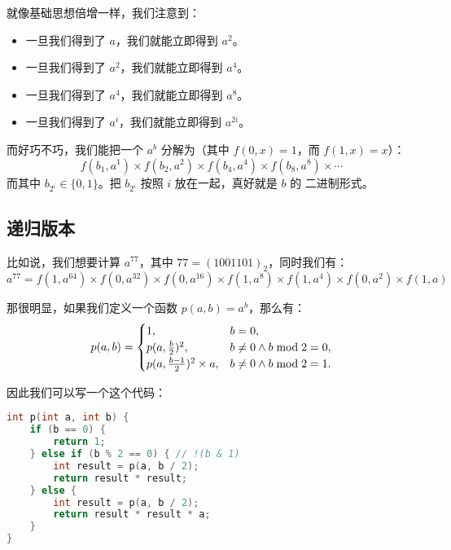 \begin{frame}
就像基础思想倍增一样，我们注意到：
\begin{itemize}
    \item 一旦我们得到了 $a$，我们就能立即得到 $a^2$。\pause
    \item 一旦我们得到了 $a^2$，我们就能立即得到 $a^4$。\pause
    \item 一旦我们得到了 $a^4$，我们就能立即得到 $a^8$。\pause
    \item 一旦我们得到了 $a^{i}$，我们就能立即得到 $a^{2i}$。\pause
\end{itemize}

而好巧不巧，我们能把一个 $a^b$ 分解为（其中 $f(0, x) = 1$，而 $f(1, x) = x$）： \[
    f(b_1, a^1) \times f(b_2, a^2) \times f(b_4, a^4) \times f(b_8, a^8) \times \cdots
\]而其中 $b_{2^i} \in \{0, 1\}$。把 $b_{2^i}$ 按照 $i$ 放在一起，真好就是 $b$ 的
二进制形式。
\end{frame}

\subsection{递归版本}
\begin{frame}
比如说，我们想要计算 $a^{77}$，其中 $77 = (1001101)_2$，同时我们有：\[
    a^{77} = f(1, a^{64}) \times f(0, a^{32}) \times f(0, a^{16}) \times f(1,
        a^{8}) \times f(1, a^{4}) \times f(0, a^{2}) \times f(1, a)
\]\pause

那很明显，如果我们定义一个函数 $p(a, b) = a^b$，那么有：\[
    p(a, b) = \begin{cases}
        1,                                & b = 0, \\
        p(a, {b \over 2})^2,              & b \not= 0 \land b \bmod 2 = 0,\\
        p(a, {b - 1 \over 2})^2 \times a, & b \not= 0 \land b \bmod 2 = 1.\\
    \end{cases}
\]
\end{frame}

\begin{frame}[fragile]
因此我们可以写一个这个代码：
\begin{lstlisting}[language=C++]
int p(int a, int b) {
    if (b == 0) {
        return 1;
    } else if (b % 2 == 0) { // !(b & 1)
        int result = p(a, b / 2);
        return result * result;
    } else {
        int result = p(a, b / 2);
        return result * result * a;
    }
}
\end{lstlisting}
\end{frame}

